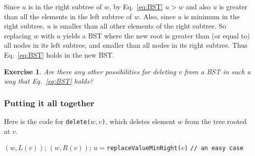 \documentclass[a4paper]{book}
\theoremstyle{changebreak}                %
\newtheorem{ex}[result]{Exercise}
\begin{document}
Since $u$ is in the right subtree of $w$, by Eq.~\eqref{eq:BST}
$u>w$ and also $u$ is greater than all the elements in the left
subtree of $w$. Also, since $u$ is minimum in the right subtree, $u$
is smaller than all other elements of the right subtree. So replacing
$w$ with $u$ yields a BST where the new root is
greater than (or equal to) all nodes in its left
subtree, and smaller than all nodes in its right
subtree. Thus Eq.~\eqref{eq:BST} holds in the new
BST.

\begin{ex}
Are there any other possibilities for deleting $v$ from a BST in such
a way that Eq.~\eqref{eq:BST} holds?
\end{ex}

\subsubsection{Putting it all together}
Here is the code for {\tt delete($w,v$)}, which
deletes element $w$ from the tree rooted at $v$.
\begin{algorithmic}[1]
    $(w,L(v))$;
    $(w,R(v))$;
  \ELSE 
    \ELSE
      \STATE $u=${\tt replaceValueMinRight($v$)}
       {\tt // an easy case}
    \ENDIF
  \ENDIF
\end{algorithmic}
\end{document}
